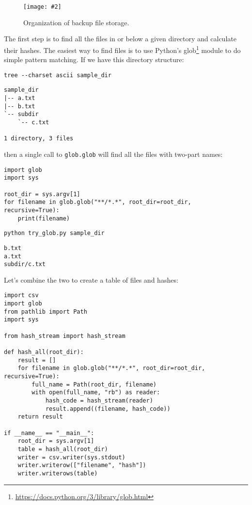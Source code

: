 \documentclass{scrbook}
\newcommand{\figpdf}[4]{\begin{figure}%
\centering%
\texttt{[image: \#2]}%
\caption{#3}%
\label{#1}%
\end{figure}}
\newcommand{\hreffoot}[2]{{#1}\footnote{\href{#2}{#2}}}
\begin{document}
\figpdf{backup-storage}{./backup/storage.pdf}{Organization of backup file storage.}{0.6}


The first step is to find all the files in or below a given directory
and calculate their hashes.
The easiest way to find files is to use Python's \hreffoot{glob}{https://docs.python.org/3/library/glob.html} module
to do simple pattern matching.
If we have this directory structure:


\begin{lstlisting}[frame=single,frameround=tttt]
tree --charset ascii sample_dir
\end{lstlisting}



\begin{lstlisting}[frame=single,frameround=tttt]
sample_dir
|-- a.txt
|-- b.txt
`-- subdir
    `-- c.txt

1 directory, 3 files
\end{lstlisting}



\noindent then a single call to \texttt{glob.glob} will find all the files with two-part names:


\begin{lstlisting}[frame=single,frameround=tttt]
import glob
import sys

root_dir = sys.argv[1]
for filename in glob.glob("**/*.*", root_dir=root_dir, recursive=True):
    print(filename)
\end{lstlisting}



\begin{lstlisting}[frame=single,frameround=tttt]
python try_glob.py sample_dir
\end{lstlisting}



\begin{lstlisting}[frame=single,frameround=tttt]
b.txt
a.txt
subdir/c.txt
\end{lstlisting}



Let's combine the two to create a table of files and hashes:


\begin{lstlisting}[frame=single,frameround=tttt]
import csv
import glob
from pathlib import Path
import sys

from hash_stream import hash_stream

def hash_all(root_dir):
    result = []
    for filename in glob.glob("**/*.*", root_dir=root_dir, recursive=True):
        full_name = Path(root_dir, filename)
        with open(full_name, "rb") as reader:
            hash_code = hash_stream(reader)
            result.append((filename, hash_code))
    return result

if __name__ == "__main__":
    root_dir = sys.argv[1]
    table = hash_all(root_dir)
    writer = csv.writer(sys.stdout)
    writer.writerow(["filename", "hash"])
    writer.writerows(table)
\end{lstlisting}
\end{document}

